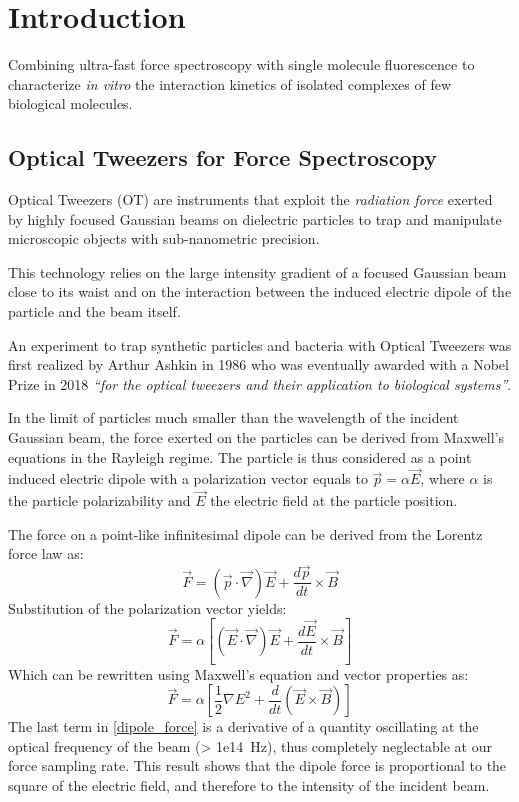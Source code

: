 \chapter{Introduction}




Combining ultra-fast force spectroscopy with single molecule
fluorescence to characterize \textit{in vitro} the interaction
kinetics of isolated complexes of few biological molecules.


\section{Optical Tweezers for Force Spectroscopy}

Optical Tweezers (OT) are instruments that exploit the
\emph{radiation force} exerted by highly focused Gaussian beams on
dielectric particles to trap and manipulate microscopic objects with
sub-nanometric precision.

This technology relies on the large intensity gradient of a focused
Gaussian beam close to its waist and on the interaction between the
induced electric dipole of the particle and the beam itself.

An experiment to trap synthetic particles and bacteria with Optical
Tweezers was first realized by Arthur Ashkin in 1986\cite{Ashkin:86}
who was eventually awarded with a Nobel Prize in 2018
\emph{``for the optical tweezers and their application to biological
systems''}.

In the limit of particles much smaller than the wavelength of the
incident Gaussian beam, the force exerted on the particles can be
derived from Maxwell's equations in the Rayleigh regime. The particle
is thus considered as a point induced electric dipole with a
polarization vector equals to $\vec{p} = \alpha \vec{E}$, where
$\alpha$ is the particle polarizability and $\vec{E}$ the electric
field at the particle position.

The force on a point-like infinitesimal dipole can be derived from
the Lorentz force law as:
$$ \vec{F}
= \left(\vec{p} \cdot \vec{\nabla}\right)\vec{E}
+ \frac{d\vec{p}}{dt} \times \vec{B}
$$
Substitution of the polarization vector yields:
$$ \vec{F} = \alpha
\left[
    \left(\vec{E} \cdot \vec{\nabla}\right)\vec{E}
    + \frac{d\vec{E}}{dt} \times \vec{B}
\right]
$$
Which can be rewritten using Maxwell's equation and vector
properties as: 
\begin{equation}
\label{dipole_force}
\vec{F}
= \alpha 
\left[
    \frac{1}{2}\nabla E^2
    + \frac{d}{dt}\left(\vec{E} \times \vec{B}\right)
\right]
\end{equation}
The last term in \ref{dipole_force} is a derivative of a quantity oscillating
at the optical frequency of the beam (\SI{> 1e14}{\Hz}), thus completely neglectable
at our force sampling rate.
This result shows that the dipole force is proportional to the square of the electric
field, and therefore to the intensity of the incident beam.
\section{}